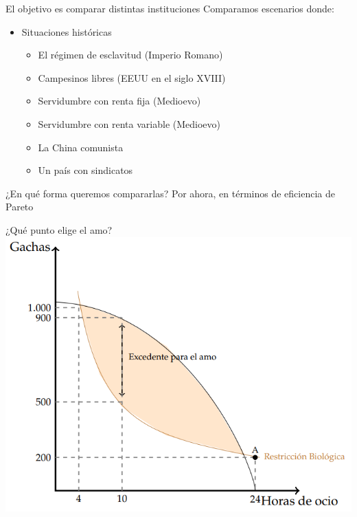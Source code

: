 \documentclass{beamer}
\begin{document}
\begin{frame}{El objetivo es comparar distintas instituciones}
    Comparamos escenarios donde:
        \begin{itemize}
            \item Situaciones históricas
            \begin{itemize}
                \item El régimen de esclavitud (Imperio Romano)
                \item Campesinos libres (EEUU en el siglo XVIII)
                \item Servidumbre con renta fija (Medioevo)
                \item Servidumbre con renta variable (Medioevo)
                \item La China comunista
                \item Un país con sindicatos
            \end{itemize}
        \end{itemize}
    ¿En qué forma queremos compararlas? Por ahora, en términos de eficiencia de Pareto
\end{frame}

\begin{frame}{¿Qué punto elige el amo?}
    \centering
    \includegraphics[scale=0.6]{../Figures/C19.7.png}
\end{frame}
\end{document}
